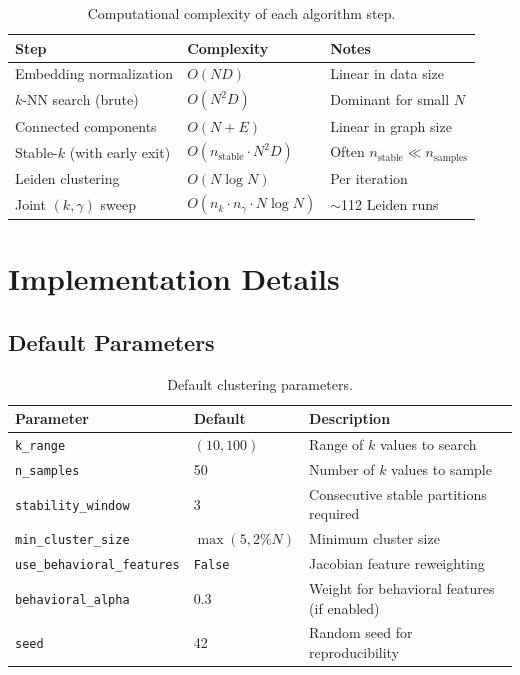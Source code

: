 \documentclass[11pt,a4paper]{article}
\begin{document}
\begin{table}[h]
\centering
\begin{tabular}{@{}lll@{}}
\toprule
\textbf{Step} & \textbf{Complexity} & \textbf{Notes} \\
\midrule
Embedding normalization & $O(ND)$ & Linear in data size \\
$k$-NN search (brute) & $O(N^2 D)$ & Dominant for small $N$ \\
Connected components & $O(N + E)$ & Linear in graph size \\
Stable-$k$ (with early exit) & $O(n_{\text{stable}} \cdot N^2 D)$ & Often $n_{\text{stable}} \ll n_{\text{samples}}$ \\
Leiden clustering & $O(N \log N)$ & Per iteration \\
Joint $(k, \gamma)$ sweep & $O(n_k \cdot n_\gamma \cdot N \log N)$ & $\sim$112 Leiden runs \\
\bottomrule
\end{tabular}
\caption{Computational complexity of each algorithm step.}
\end{table}

\section{Implementation Details}

\subsection{Default Parameters}

\begin{table}[h]
\centering
\begin{tabular}{@{}lll@{}}
\toprule
\textbf{Parameter} & \textbf{Default} & \textbf{Description} \\
\midrule
\texttt{k\_range} & $(10, 100)$ & Range of $k$ values to search \\
\texttt{n\_samples} & 50 & Number of $k$ values to sample \\
\texttt{stability\_window} & 3 & Consecutive stable partitions required \\
\texttt{min\_cluster\_size} & $\max(5, 2\%N)$ & Minimum cluster size \\
\texttt{use\_behavioral\_features} & \texttt{False} & Jacobian feature reweighting \\
\texttt{behavioral\_alpha} & 0.3 & Weight for behavioral features (if enabled) \\
\texttt{seed} & 42 & Random seed for reproducibility \\
\bottomrule
\end{tabular}
\caption{Default clustering parameters.}
\end{table}
\end{document}
